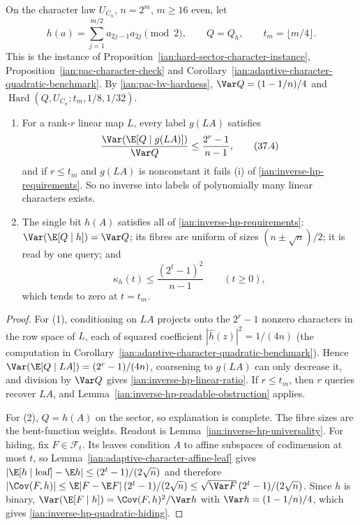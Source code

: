 \begin{proposition}
\label{ian:inverse-hp-linear-character}
On the character law \(U_{C_n}\), \(n=2^m\), \(m\ge16\) even, let
\[
 h(a)=\sum_{j=1}^{m/2}a_{2j-1}a_{2j}\pmod2,\qquad
 Q=Q_h,\qquad t_m=\lfloor m/4\rfloor .
 \tag{37.3}\label{ian:inverse-hp-quadratic-target}
\]
This is the instance of Proposition~\ref{ian:hard-sector-character-instance}, Proposition~\ref{ian:pac-character-check} and Corollary~\ref{ian:adaptive-character-quadratic-benchmark}. By \eqref{ian:pac-bv-hardness}, \(\Var Q=(1-1/n)/4\) and \(\operatorname{Hard}(Q,U_{C_n};t_m,1/8,1/32)\).
\begin{enumerate}
\item For a rank-\(r\) linear map \(L\), every label \(g(LA)\) satisfies
\[
 \frac{\Var(\E[Q\mid g(LA)])}{\Var Q}\le\frac{2^r-1}{n-1},
 \tag{37.4}\label{ian:inverse-hp-linear-ratio}
\]
and if \(r\le t_m\) and \(g(LA)\) is nonconstant it fails (i) of \eqref{ian:inverse-hp-requirements}. So no inverse into labels of polynomially many linear characters exists.
\item The single bit \(h(A)\) satisfies all of \eqref{ian:inverse-hp-requirements}: \(\Var(\E[Q\mid h])=\Var Q\); its fibres are uniform of sizes \((n\pm\sqrt n)/2\); it is read by one query; and
\[
 \kappa_h(t)\le\frac{(2^t-1)^2}{n-1}\qquad(t\ge0),
 \tag{37.5}\label{ian:inverse-hp-quadratic-hiding}
\]
which tends to zero at \(t=t_m\).
\end{enumerate}
\end{proposition}

\begin{proof}
For (1), conditioning on \(LA\) projects onto the \(2^r-1\) nonzero characters in the row space of \(L\), each of squared coefficient \(|\widehat h(z)|^2=1/(4n)\) (the computation in Corollary~\ref{ian:adaptive-character-quadratic-benchmark}). Hence \(\Var(\E[Q\mid LA])=(2^r-1)/(4n)\), coarsening to \(g(LA)\) can only decrease it, and division by \(\Var Q\) gives \eqref{ian:inverse-hp-linear-ratio}. If \(r\le t_m\), then \(r\) queries recover \(LA\), and Lemma~\ref{ian:inverse-hp-readable-obstruction} applies.

For (2), \(Q=h(A)\) on the sector, so explanation is complete. The fibre sizes are the bent-function weights. Readout is Lemma~\ref{ian:inverse-hp-universality}. For hiding, fix \(F\in\mathcal F_t\). Its leaves condition \(A\) to affine subspaces of codimension at most \(t\), so Lemma~\ref{ian:adaptive-character-affine-leaf} gives \(|\E[h\mid\text{leaf}]-\E h|\le(2^t-1)/(2\sqrt n)\) and therefore \(|\Cov(F,h)|\le\E|F-\E F|\,(2^t-1)/(2\sqrt n)\le\sqrt{\Var F}\,(2^t-1)/(2\sqrt n)\). Since \(h\) is binary, \(\Var(\E[F\mid h])=\Cov(F,h)^2/\Var h\) with \(\Var h=(1-1/n)/4\), which gives \eqref{ian:inverse-hp-quadratic-hiding}.
\end{proof}


